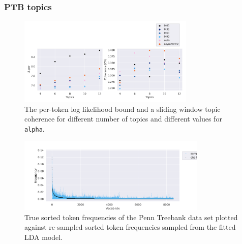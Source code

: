 \subsubsection{PTB topics}

\begin{figure}[!htb]
    \centering
    \includegraphics[width=0.75\textwidth]{images/bda_checks/ptb_topics/LDA_tune_results.png}
    \caption{The per-token log likelihood bound and a sliding window topic coherence for different number of topics and different values for \texttt{alpha}.}
    \label{fig:bda_checks_lda_hp_tuning}
\end{figure}

\begin{figure}[!htb]
    \centering
    \includegraphics[width=0.8\textwidth]{images/bda_checks/ptb_topics/lda_word_dist_check.png}
    \caption{True sorted token frequencies of the Penn Treebank data set plotted against re-sampled sorted token frequencies sampled from the fitted LDA model.}
    \label{fig:bda_checks_lda_word_freqs}
\end{figure}


